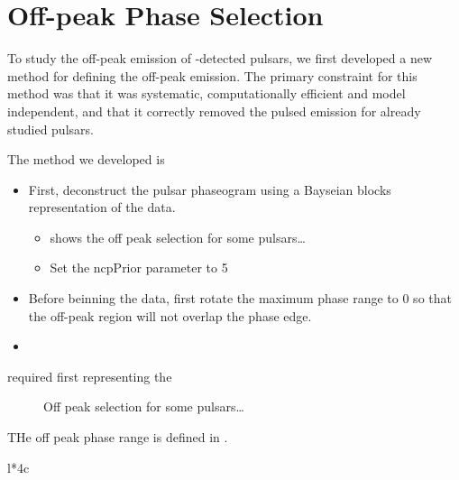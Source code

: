 \section{Off-peak Phase Selection}


To study the off-peak emission of \lat-detected pulsars, we first
developed a new method for defining the off-peak emission.
The primary constraint for this method was that it was systematic,
computationally efficient and model independent, and that it correctly
removed the pulsed emission for already studied pulsars.

The method we developed is
\begin{itemize}
  \item First, deconstruct the pulsar phaseogram 
    using a Bayseian blocks representation of the data.
    \begin{itemize}
      \item {} shows the off peak selection for some pulsars\dots
      \item Set the ncpPrior parameter to 5
    \end{itemize}
  \item Before beinning the data, first rotate the maximum phase range to 0
    so that the off-peak region will not overlap the phase edge.
  \item 
\end{itemize}
  required first representing the 


\begin{figure}
  \ifdefined\bwfigures
  \else
  \fi
  \caption{Off peak selection for some pulsars\dots}
  \label{fig:off_peak_select}
\end{figure}


THe off peak phase range is defined in .


\begin{deluxetable}{l*{4}c}
  \tabletypesize{\scriptsize}
  
\end{deluxetable}

